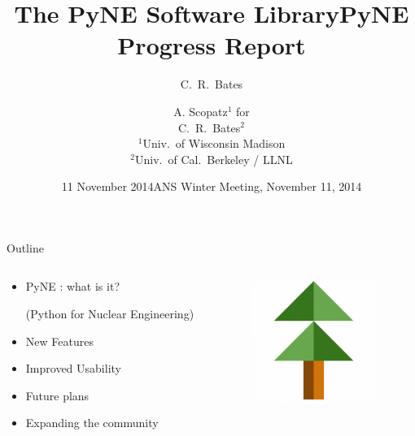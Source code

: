 \documentclass[xcolor=x11names,compress]{beamer}
\title{The PyNE Software Library}
\author{C.\ R.\ Bates}
\date{11 November 2014}
\renewcommand{\(}{\begin{columns}}
\renewcommand{\)}{\end{columns}}
\newcommand{\<}[1]{\begin{column}{#1}}
\renewcommand{\>}{\end{column}}
\begin{document}
\begin{frame}
\title{PyNE Progress Report}
\author{A. Scopatz$^1$ for
        \\C.\ R.\ Bates$^2$ 
        \\ $^1$Univ.\ of Wisconsin Madison
        \\ $^2$Univ.\ of Cal.\ Berkeley / LLNL}

\date{ANS Winter Meeting, November 11, 2014}
\titlepage
\end{frame}

\begin{frame}{Outline}

	\begin{columns}
  	\begin{column}{0.5\textwidth}
	    \begin{itemize}
        \item PyNE \cite{pyne}: what is it?
        
        (Python for Nuclear Engineering)
        \item New Features
        \item Improved Usability
        \item Future plans
        \item Expanding the community
	    \end{itemize}
  	\end{column}
 	\begin{column}{0.4\textwidth}
 	   \begin{center}
 	   \begin{figure}
       \includegraphics[height=4cm]{pyne-icon-big.png}
	   \end{figure}
 	   \end{center}
  	\end{column}
	\end{columns}

\end{frame}
\end{document}
